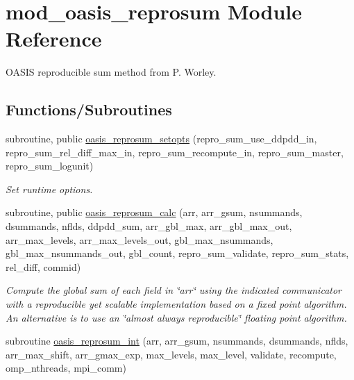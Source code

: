 \hypertarget{namespacemod__oasis__reprosum}{}\section{mod\+\_\+oasis\+\_\+reprosum Module Reference}
\label{namespacemod__oasis__reprosum}


O\+A\+S\+IS reproducible sum method from P. Worley.  


\subsection*{Functions/\+Subroutines}
\begin{DoxyCompactItemize}
\item 
subroutine, public \hyperlink{namespacemod__oasis__reprosum_ad6b4914497a4961339a1c95bfb807660}{oasis\+\_\+reprosum\+\_\+setopts} (repro\+\_\+sum\+\_\+use\+\_\+ddpdd\+\_\+in, repro\+\_\+sum\+\_\+rel\+\_\+diff\+\_\+max\+\_\+in, repro\+\_\+sum\+\_\+recompute\+\_\+in, repro\+\_\+sum\+\_\+master, repro\+\_\+sum\+\_\+logunit)
\begin{DoxyCompactList}\small\item\em Set runtime options. \end{DoxyCompactList}\item 
subroutine, public \hyperlink{namespacemod__oasis__reprosum_a398280c78cff126b7622dbd96af675e4}{oasis\+\_\+reprosum\+\_\+calc} (arr, arr\+\_\+gsum, nsummands, dsummands, nflds, ddpdd\+\_\+sum, arr\+\_\+gbl\+\_\+max, arr\+\_\+gbl\+\_\+max\+\_\+out, arr\+\_\+max\+\_\+levels, arr\+\_\+max\+\_\+levels\+\_\+out, gbl\+\_\+max\+\_\+nsummands, gbl\+\_\+max\+\_\+nsummands\+\_\+out, gbl\+\_\+count, repro\+\_\+sum\+\_\+validate, repro\+\_\+sum\+\_\+stats, rel\+\_\+diff, commid)
\begin{DoxyCompactList}\small\item\em Compute the global sum of each field in \char`\"{}arr\char`\"{} using the indicated communicator with a reproducible yet scalable implementation based on a fixed point algorithm. An alternative is to use an \char`\"{}almost
 always reproducible\char`\"{} floating point algorithm. \end{DoxyCompactList}\item 
subroutine \hyperlink{namespacemod__oasis__reprosum_a7ea3c5bad9db10c80eb528453602aed3}{oasis\+\_\+reprosum\+\_\+int} (arr, arr\+\_\+gsum, nsummands, dsummands, nflds, arr\+\_\+max\+\_\+shift, arr\+\_\+gmax\+\_\+exp, max\+\_\+levels, max\+\_\+level, validate, recompute, omp\+\_\+nthreads, mpi\+\_\+comm)

\end{DoxyCompactItemize}

